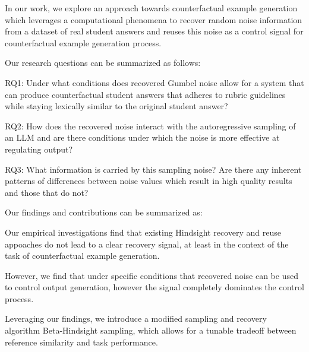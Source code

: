 In our work, we explore an approach towards counterfactual example generation which leverages a computational phenomena to recover random noise information from a dataset of real student answers and reuses this noise as a control signal for counterfactual example generation process. 

Our research questions can be summarized as follows:

RQ1: Under what conditions does recovered Gumbel noise allow for a system that can produce counterfactual student answers that adheres to rubric guidelines while staying lexically similar to the original student answer?

RQ2: How does the recovered noise interact with the autoregressive sampling of an LLM and are there conditions under which the noise is more effective at regulating output?

RQ3: What information is carried by this sampling noise? Are there any inherent patterns of differences between noise values which result in high quality results and those that do not?

Our findings and contributions can be summarized as:

Our empirical investigations find that existing Hindsight recovery and reuse appoaches do not lead to a clear recovery signal, at least in the context of the task of counterfactual example generation.

However, we find that under specific conditions that recovered noise can be used to control output generation, however the signal completely dominates the control process.

Leveraging our findings, we introduce a modified sampling and recovery algorithm Beta-Hindsight sampling, which allows for a tunable tradeoff between reference similarity and task performance.


